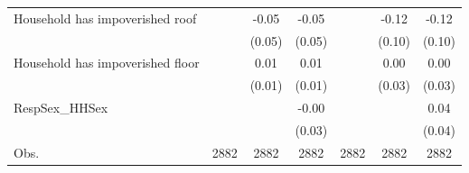 {\begin{tabular}{l*{6}{c}}
Household has impoverished roof&                     &       -0.05         &       -0.05         &                     &       -0.12         &       -0.12         \\
                    &                     &      (0.05)         &      (0.05)         &                     &      (0.10)         &      (0.10)         \\
Household has impoverished floor&                     &        0.01         &        0.01         &                     &        0.00         &        0.00         \\
                    &                     &      (0.01)         &      (0.01)         &                     &      (0.03)         &      (0.03)         \\
RespSex\_HHSex       &                     &                     &       -0.00         &                     &                     &        0.04         \\
                    &                     &                     &      (0.03)         &                     &                     &      (0.04)         \\
\hline
Obs.                &        2882         &        2882         &        2882         &        2882         &        2882         &        2882         \\
\hline\hline
\end{tabular}
}
